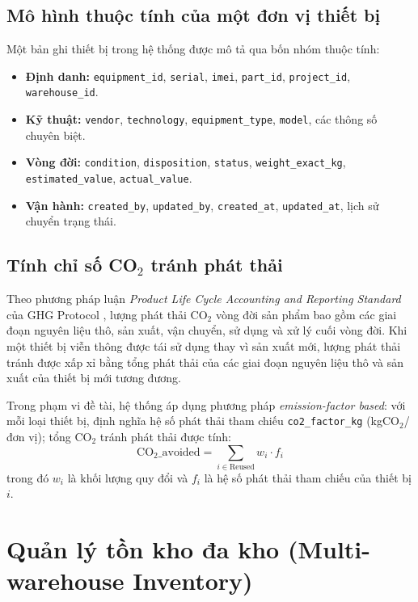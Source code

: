 \subsection{Mô hình thuộc tính của một đơn vị thiết bị}
Một bản ghi thiết bị trong hệ thống được mô tả qua bốn nhóm thuộc tính:

\begin{itemize}[leftmargin=1.2cm]
    \item \textbf{Định danh:} \texttt{equipment\_id}, \texttt{serial}, \texttt{imei}, \texttt{part\_id}, \texttt{project\_id}, \texttt{warehouse\_id}.
    \item \textbf{Kỹ thuật:} \texttt{vendor}, \texttt{technology}, \texttt{equipment\_type}, \texttt{model}, các thông số chuyên biệt.
    \item \textbf{Vòng đời:} \texttt{condition}, \texttt{disposition}, \texttt{status}, \texttt{weight\_exact\_kg}, \texttt{estimated\_value}, \texttt{actual\_value}.
    \item \textbf{Vận hành:} \texttt{created\_by}, \texttt{updated\_by}, \texttt{created\_at}, \texttt{updated\_at}, lịch sử chuyển trạng thái.
\end{itemize}

\subsection{Tính chỉ số CO$_2$ tránh phát thải}
Theo phương pháp luận \emph{Product Life Cycle Accounting and Reporting Standard} của GHG Protocol \cite{ghgprotocol2011}, lượng phát thải CO$_2$ vòng đời sản phẩm bao gồm các giai đoạn nguyên liệu thô, sản xuất, vận chuyển, sử dụng và xử lý cuối vòng đời. Khi một thiết bị viễn thông được tái sử dụng thay vì sản xuất mới, lượng phát thải tránh được xấp xỉ bằng tổng phát thải của các giai đoạn nguyên liệu thô và sản xuất của thiết bị mới tương đương.

Trong phạm vi đề tài, hệ thống áp dụng phương pháp \emph{emission-factor based}: với mỗi loại thiết bị, định nghĩa hệ số phát thải tham chiếu \texttt{co2\_factor\_kg} (kgCO$_2$/đơn vị); tổng CO$_2$ tránh phát thải được tính:
\[
    \mathrm{CO_2\_avoided} = \sum_{i \in \mathrm{Reused}} w_i \cdot f_i
\]
trong đó $w_i$ là khối lượng quy đổi và $f_i$ là hệ số phát thải tham chiếu của thiết bị $i$.

\section{Quản lý tồn kho đa kho (Multi-warehouse Inventory)}
\label{sec:inventory}

